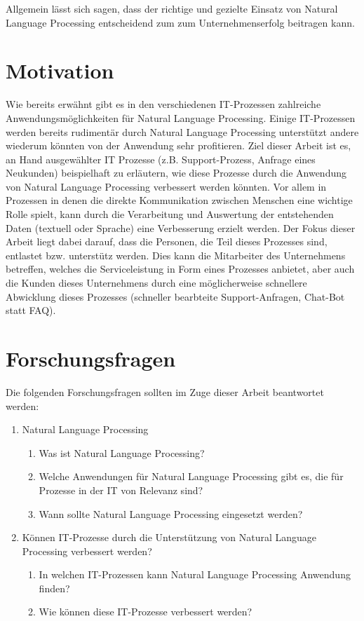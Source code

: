 \documentclass[a4paper]{scrartcl}
\begin{document}
Allgemein lässt sich sagen, dass der richtige und gezielte Einsatz von Natural Language Processing entscheidend zum zum Unternehmenserfolg beitragen kann. 

\section{Motivation}
Wie bereits erwähnt gibt es in den verschiedenen IT-Prozessen zahlreiche Anwendungsmöglichkeiten für Natural Language Processing. Einige IT-Prozessen werden bereits rudimentär durch Natural Language Processing unterstützt andere wiederum könnten von der Anwendung sehr profitieren. Ziel dieser Arbeit ist es, an Hand ausgewählter IT Prozesse (z.B. Support-Prozess, Anfrage eines Neukunden) beispielhaft zu erläutern, wie diese Prozesse durch die Anwendung von Natural Language Processing verbessert werden könnten. Vor allem in Prozessen in denen die direkte Kommunikation zwischen Menschen eine wichtige Rolle spielt, kann durch die Verarbeitung und Auswertung der entstehenden Daten (textuell oder Sprache) eine Verbesserung erzielt werden. Der Fokus dieser Arbeit liegt dabei darauf, dass die Personen, die Teil dieses Prozesses sind, entlastet bzw. unterstütz werden. Dies kann die Mitarbeiter des Unternehmens betreffen, welches die Serviceleistung in Form eines Prozesses anbietet, aber auch die Kunden dieses Unternehmens durch eine möglicherweise schnellere Abwicklung dieses Prozesses (schneller bearbteite Support-Anfragen, Chat-Bot statt FAQ). 

\section{Forschungsfragen}
Die folgenden Forschungsfragen sollten im Zuge dieser Arbeit beantwortet werden:

\begin{enumerate}
	\item Natural Language Processing \cite{Jurafsky2008} \cite{Manning1999}
	\begin{enumerate}
			\item Was ist Natural Language Processing?
			\item Welche Anwendungen für Natural Language Processing gibt es, die für Prozesse in der IT von Relevanz sind?
			\item Wann sollte Natural Language Processing eingesetzt werden?
	\end{enumerate}
	\item Können IT-Prozesse durch die Unterstützung von Natural Language Processing verbessert werden? \cite{Huber2009} \cite{Wang2008}
	\begin{enumerate}
			\item In welchen IT-Prozessen kann Natural Language Processing Anwendung finden?
			\item Wie können diese IT-Prozesse verbessert werden?
	\end{enumerate}
\end{enumerate}
\end{document}

